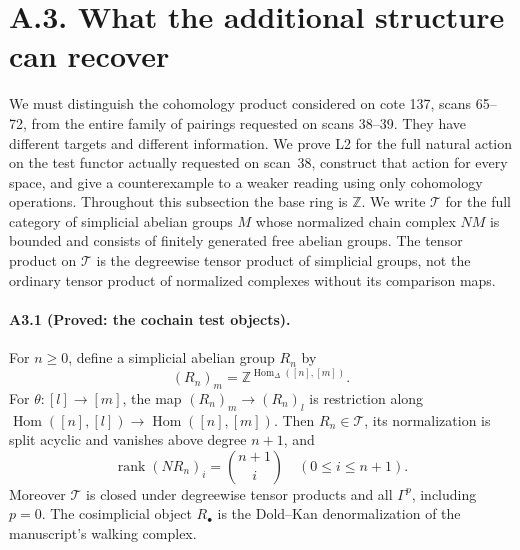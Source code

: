 \section{A.3. What the additional structure can recover}

We must distinguish the cohomology product considered on cote 137, scans
65--72, from the entire family of pairings requested on scans 38--39.
They have different targets and different information. We prove L2 for
the full natural action on the test functor actually requested on
scan~38, construct that action for every space, and give a counterexample
to a weaker reading using only cohomology operations. Throughout this
subsection the base ring is $\mathbb Z$.
We write $\mathcal T$ for the full category of simplicial abelian groups
$M$ whose normalized chain complex $NM$ is bounded and consists of
finitely generated free abelian groups. The tensor product on $\mathcal T$
is the degreewise tensor product of simplicial groups, not the ordinary
tensor product of normalized complexes without its comparison maps.

\paragraph{A3.1 (Proved: the cochain test objects).}\label{A3.1}
For $n\geq0$, define a simplicial abelian group $R_n$ by
\[
 (R_n)_m=\mathbb Z^{\operatorname{Hom}_\Delta([n],[m])}.
\]
For $\theta:[l]\to[m]$, the map $(R_n)_m\to(R_n)_l$ is restriction along
$\operatorname{Hom}([n],[l])\to\operatorname{Hom}([n],[m])$.
Then $R_n\in\mathcal T$, its normalization is split acyclic and vanishes
above degree $n+1$, and
\[
 \operatorname{rank}(NR_n)_i=\binom{n+1}{i} \quad(0\leq i\leq n+1).
\]
Moreover $\mathcal T$ is closed under degreewise tensor products and all
$\Gamma^p$, including $p=0$. The cosimplicial object $R_\bullet$ is
the Dold--Kan denormalization of the manuscript's walking complex.

